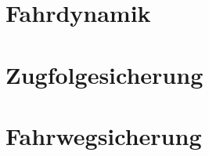 \documentclass[
  paper=a4,
  pagesize=pdftex,
  twoside=false,
  DIV=12,
  headinclude=true,
  footinclude=false,
  toc=listof,
]{scrbook}
\def\ROOT{.}
\begin{document}

  
  \tableofcontents
  
  \cleardoublepage

  \chapter{Fahrdynamik}
    
    
    \cleardoublepage
    
    \cleardoublepage
    

  \chapter{Zugfolgesicherung}
    
    \cleardoublepage
    
    \cleardoublepage
    

  \chapter{Fahrwegsicherung}
    
    \cleardoublepage
    
    \cleardoublepage
    
    \cleardoublepage
    



  \cleardoublepage
  \appendix
  
  \vhListAllAuthorsLongWithAbbrev
\end{document}
